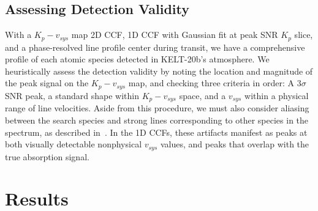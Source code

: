\documentclass[twocolumn]{aastex631}
\begin{document}
        \subsection{Assessing Detection Validity}\label{subsec:Assessing Detection Results}
            With a ${K_p-v_{sys}}$ map 2D CCF, 1D CCF with Gaussian fit at peak SNR $K_p$ slice, and a phase-resolved line profile center during transit, we have a comprehensive profile of each atomic species detected in KELT-20b's atmosphere. We heuristically assess the detection validity by noting the location and magnitude of the peak signal on the ${K_p-v_{sys}}$ map, and checking three criteria in order: A ${3\sigma}$ SNR peak, a standard shape within ${K_p-v_{sys}}$ space, and a $v_{sys}$ within a physical range of line velocities. Aside from this procedure, we must also consider aliasing between the search species and strong lines corresponding to other species in the spectrum, as described in~\citet{Borsato2023}. In the 1D CCFs, these artifacts manifest as peaks at both visually detectable nonphysical $v_{sys}$ values, and peaks that overlap with the true absorption signal.
            
            
    \section{Results}\label{sec:Results}
            
\end{document}
